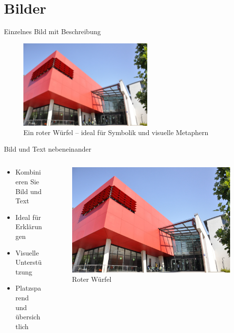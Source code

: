 \documentclass[aspectratio=169,10pt]{beamer}
\begin{document}
\section{Bilder}
\begin{frame}{Einzelnes Bild mit Beschreibung}
\begin{figure}
  \centering
  \includegraphics[width=0.6\textwidth]{assets/dm_roter_wuerfel_ben_steinig.jpg}
  \caption{Ein roter Würfel – ideal für Symbolik und visuelle Metaphern}
\end{figure}
\end{frame}

\begin{frame}{Bild und Text nebeneinander}
\begin{columns}[c]
  \begin{column}{0.5\textwidth}
    \begin{itemize}
      \item Kombinieren Sie Bild und Text
      \item Ideal für Erklärungen
      \item Visuelle Unterstützung
      \item Platzsparend und übersichtlich
    \end{itemize}
  \end{column}
  \begin{column}{0.45\textwidth}
    \begin{figure}
      \centering
      \includegraphics[width=\textwidth]{assets/dm_roter_wuerfel_ben_steinig.jpg}
      \caption{Roter Würfel}
    \end{figure}
  \end{column}
\end{columns}
\end{frame}
\end{document}
